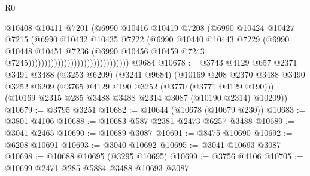 \begin{lexlean}{R0}
\begin{coremodule}
                                                      @10408
                                                      @10411
                                                      @7201
                                                      (@6990
                                                        @10416
                                                        @10419
                                                        @7208
                                                        (@6990
                                                          @10424
                                                          @10427
                                                          @7215
                                                          (@6990
                                                            @10432
                                                            @10435
                                                            @7222
                                                            (@6990
                                                              @10440
                                                              @10443
                                                              @7229
                                                              (@6990
                                                                @10448
                                                                @10451
                                                                @7236
                                                                (@6990
                                                                  @10456
                                                                  @10459
                                                                  @7243
                                                                  @7245)))))))))))))))))))))))))))))))
    @9684
@10678 := @3743
    @4129
    @657
    @2371
    @3491
    @3488
    (@3253 @6209)
    (@3241 @9684)
    (@10169
      @208
      @2370
      @3488
      @3490
      @3252
      @6209
      (@3765 @4129 @190 @3252 (@3770 (@3771 @4129 @190)))
      (@10169 @2315 @285 @3488 @3488 @2314 @3087 (@10190 @2314) @10209))
@10679 := @3795 @3251
@10682 := @10644 (@10678 (@10679 @230))
@10683 := @3801 @4106
@10688 := @10683 @587 @2381 @2473 @6257 @3488
@10689 := @3041 @2465
@10690 := @10689 @3087
@10691 := @8475 @10690
@10692 := @6208 @10691
@10693 := @3040 @10692
@10695 := @3041 @10693 @3087
@10698 := @10688 @10695 (@3295 @10695)
@10699 := @3756 @4106
@10705 := @10699 @2471 @285 @5884 @3488 @10693 @3087

\end{coremodule}
\end{lexlean}
